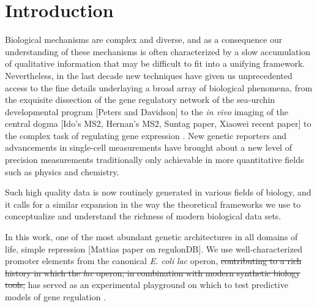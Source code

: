 \section*{Introduction}

Biological mechanisms are complex and diverse, and as a consequence our
understanding of these mechanisms is often characterized by a slow accumulation
of qualitative information that may be difficult to fit into a unifying
framework. Nevertheless, in the last decade new techniques have given us
unprecedented access to the fine details underlaying a broad array of biological
phenomena, from the exquisite dissection of the gene regulatory network of the
sea-urchin developmental program [Peters and Davidson] to the \textit{in vivo}
imaging of the central dogma [Ido's MS2, Hernan's MS2, Suntag paper, Xiaowei
recent paper] to the complex task of regulating gene expression
\cite{Garcia2011}. New genetic reporters and advancements in single-cell
measurements have brought about a new level of precision measurements
traditionally only achievable in more quantitative fields such as physics and
chemistry.

Such high quality data is now routinely generated in various fields of biology,
and it calls for a similar expansion in the way the theoretical frameworks we
use to conceptualize and understand the richness of modern biological data sets.

In this work,  one of the
most abundant genetic architectures in all domains of life, simple repression
[Mattias paper on regulonDB]. We use well-characterized promoter elements from
the canonical \textit{E. coli} \textit{lac} operon, 
\sout{contributing to a rich history in which the \textit{lac} operon, in
	combination with modern synthetic biology tools,} has  served
as an experimental playground on which to test predictive models of gene
regulation \cite{Bintu2005, Bintu2005a, Garcia2011}. 

